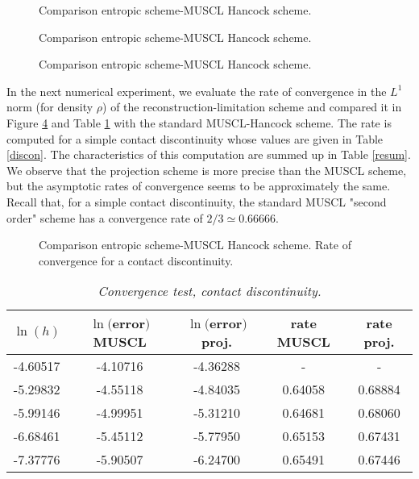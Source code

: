 \documentclass{fldauth}
\theoremstyle{plain}
\theoremstyle{plain}
\theoremstyle{plain}
\theoremstyle{plain}
\theoremstyle{plain}
\theoremstyle{plain}
\begin{document}
\begin{figure}[b]
\caption{Comparison entropic scheme-MUSCL Hancock
scheme.\label{figrho2}}
\end{figure}
\begin{figure}[b]
\caption{Comparison entropic scheme-MUSCL Hancock
scheme.\label{figvit2}}
\end{figure}
\begin{figure}[b]
\caption{Comparison entropic scheme-MUSCL Hancock
scheme.\label{figpres2}}
\end{figure}


In the next numerical experiment, we evaluate the rate of
convergence in the $L^1$ norm (for density $\rho$) of the
reconstruction-limitation scheme and compared it in
 Figure
\ref{rate} and Table \ref{ratet} with the standard MUSCL-Hancock
scheme. The rate is computed for a simple contact discontinuity
whose values are given in Table \ref{discon}. The characteristics
of this computation are summed up in Table \ref{resum}. We observe
that the projection scheme is more precise than the MUSCL scheme,
but the asymptotic rates of convergence seems to be approximately
the same. Recall that, for a simple contact discontinuity, the
standard MUSCL "second order" scheme has a convergence rate of
$2/3 \simeq 0.66666$.

\begin{figure}[b]
\caption{Comparison entropic scheme-MUSCL Hancock scheme. Rate of
convergence for a contact discontinuity.\label{rate}}
\end{figure}

\begin{table}[h]
\begin{center}
\begin{tabular}{|c|c|c|c|c|}
\hline $\ln(h)$ & $\ln($error$)$ MUSCL& $\ln($error$)$ proj. & rate MUSCL & rate proj.\\

\hline



-4.60517 &-4.10716 &-4.36288 & -&- \\ \hline

-5.29832 &-4.55118 &-4.84035 & 0.64058&0.68884 \\ \hline

-5.99146 &-4.99951 &-5.31210 & 0.64681&0.68060 \\ \hline

-6.68461 &-5.45112 &-5.77950 & 0.65153&0.67431 \\ \hline

-7.37776 &-5.90507 &-6.24700 & 0.65491&0.67446 \\ \hline
\end{tabular}
\caption{\label{ratet}\textit{Convergence test, contact
discontinuity.}}
\end{center}
\end{table}
\end{document}
